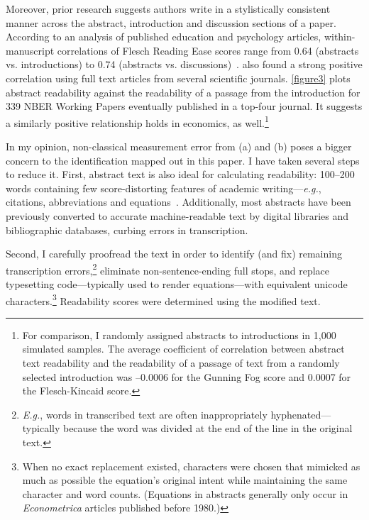 \begin{appendices}
\begin{refsection}
Moreover, prior research suggests authors write in a stylistically consistent manner across the abstract, introduction and discussion sections of a paper. According to an analysis of published education and psychology articles, within-manuscript correlations of Flesch Reading Ease scores range from 0.64 (abstracts vs. introductions) to 0.74 (abstracts vs. discussions)~\citep{Hartley2003b}.  \citet{Plaven-Sigray2017} also found a strong positive correlation using full text articles from several scientific journals. \autoref{figure3} plots abstract readability against the readability of a passage from the introduction for 339 NBER Working Papers eventually published in a top-four journal. It suggests a similarly positive relationship holds in economics, as well.\footnote{For comparison, I randomly assigned abstracts to introductions in 1,000 simulated samples. The average coefficient of correlation between abstract text readability and the readability of a passage of text from a randomly selected introduction was --0.0006 for the Gunning Fog score and 0.0007 for the Flesch-Kincaid score.}



In my opinion, non-classical measurement error from (a) and (b) poses a bigger concern to the identification mapped out in this paper. I have taken several steps to reduce it. First, abstract text is also ideal for calculating readability: 100--200 words containing few score-distorting features of academic writing---\emph{e.g.}, citations, abbreviations and equations~\citep{Dale1948}. Additionally, most abstracts have been previously converted to accurate machine-readable text by digital libraries and bibliographic databases, curbing errors in transcription.

Second, I carefully proofread the text in order to identify (and fix) remaining transcription errors,\footnote{\emph{E.g.}, words in transcribed text are often inappropriately hyphenated---typically because the word was divided at the end of the line in the original text.} eliminate non-sentence-ending full stops, and replace typesetting code---typically used to render equations---with equivalent unicode characters.\footnote{When no exact replacement existed, characters were chosen that mimicked as much as possible the equation's original intent while maintaining the same character and word counts. (Equations in abstracts generally only occur in \emph{Econometrica} articles published before 1980.)} Readability scores were determined using the modified text.


\end{refsection}
\end{appendices}

